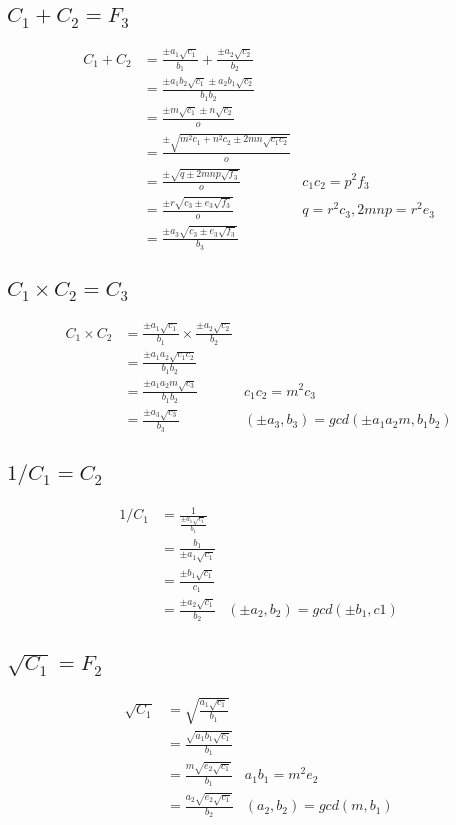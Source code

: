 \documentclass{article}
\begin{document}
\subsection{$C_1 + C_2 = F_3$} %
\begin{align*}
 C_1 + C_2 &= \frac{\pm a_1\sqrt{c_1}}{b_1} + \frac{\pm a_2\sqrt{c_2}}{b_2} \\
 &= \frac{\pm a_1b_2\sqrt{c_1} \pm a_2b_1\sqrt{c_2}}{b_1b_2} \\
 &= \frac{\pm m\sqrt{c_1} \pm n\sqrt{c_2}}{o} \\
 &= \frac{\pm \sqrt{m^2c_1 + n^2c_2 \pm 2mn\sqrt{c_1c_2}}}{o} \\
 &= \frac{\pm \sqrt{q \pm 2mnp\sqrt{f_3}}}{o}     & c_1c_2 = p^2f_3\\
 &= \frac{\pm r\sqrt{c_3 \pm e_3\sqrt{f_3}}}{o}   & q = r^2c_3, 2mnp = r^2e_3 \\
 &= \frac{\pm a_3\sqrt{c_3 \pm e_3\sqrt{f_3}}}{b_3}
\end{align*}



\subsection{$C_1 \times C_2 = C_3$}
\begin{align*}
C_1 \times C_2 &= \frac{\pm a_1\sqrt{c_1}}{b_1} \times \frac{\pm a_2\sqrt{c_2}}{b_2}\\
 &= \frac{\pm a_1a_2\sqrt{c_1c_2}}{b_1b_2}\\
 &= \frac{\pm a_1a_2m\sqrt{c_3}}{b_1b_2} & c_1c_2 = m^2c_3\\
 &= \frac{\pm a_3\sqrt{c_3}}{b_3} & (\pm a_3,b_3) = gcd(\pm a_1a_2m,b_1b_2)
\end{align*}


\subsection{$1 / C_1 = C_2$}
\begin{align*}
1 / C_1 &= \frac{1}{\frac{\pm a_1\sqrt{c_1}}{b_1}} \\
 &= \frac{b_1}{\pm a_1\sqrt{c_1}}\\
 &= \frac{\pm b_1\sqrt{c_1}}{c_1}\\
 &= \frac{\pm a_2\sqrt{c_1}}{b_2}  & (\pm a_2, b_2) = gcd(\pm b_1, c1)
\end{align*}


\subsection{$\sqrt{C_1} = F_2$}
\begin{align*}
\sqrt{C_1} &= \sqrt{\frac{a_1\sqrt{c_1}}{b_1}}\\
 &= \frac{\sqrt{a_1b_1\sqrt{c_1}}}{b_1}     \\
 &= \frac{m\sqrt{e_2\sqrt{c_1}}}{b_1}       & a_1b_1 = m^2e_2\\
 &= \frac{a_2\sqrt{e_2\sqrt{c_1}}}{b_2}     & (a_2,b_2) = gcd(m,b_1)
\end{align*}
\end{document}
